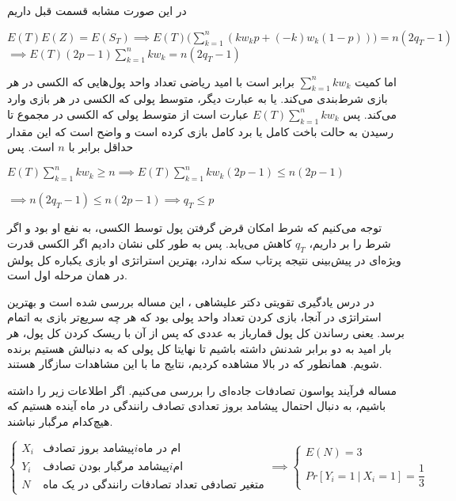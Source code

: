 \documentclass{scribe-cgenomics}
\begin{document}
\begin{حل}
در این صورت مشابه قسمت قبل داریم

\begin{center}
$
E(T)E(Z) = E(S_T) 
\implies
E(T) \big( \sum_{k=1}^{n} (kw_k p + (-k)w_k(1-p)) \big) = n(2q_T-1)
$
\bigbreak
$
\implies
E(T)(2p-1)\sum_{k=1}^{n} kw_k = n(2q_T-1)
$
\end{center}

اما کمیت
$\sum_{k=1}^{n}kw_k$
برابر است با امید ریاضی تعداد واحد پول‌هایی که الکسی در هر بازی شرط‌بندی می‌کند. یا به عبارت دیگر، متوسط پولی که الکسی در هر بازی وارد می‌کند. پس
$E(T)\sum_{k=1}^{n}kw_k$
عبارت است از متوسط پولی که الکسی در مجموع تا رسیدن به
حالت باخت کامل یا برد کامل بازی کرده است و واضح است که این مقدار حداقل برابر با
$n$
است. پس

\begin{center}
$
E(T) \sum_{k=1}^{n}kw_k \geq n
\implies 
E(T) \sum_{k=1}^{n}kw_k (2p-1) \leq n (2p-1)
$

$
\implies 
n(2q_T-1) \leq n(2p-1)
\implies
q_T \leq p
$
\end{center}

توجه می‌کنیم که شرط امکان قرض گرفتن پول توسط الکسی، به نفع او بود و اگر شرط را بر داریم،
$q_T$
کاهش می‌یابد. پس به طور کلی نشان دادیم اگر الکسی قدرت ویژه‌ای در پیش‌بینی نتیجه پرتاب سکه ندارد، بهترین استراتژی او بازی یکباره کل پولش در همان مرحله اول است.

\bigbreak

در درس یادگیری تقویتی دکتر علیشاهی
\cite{alishahi_RL}، 
این مساله بررسی شده است و بهترین استراتژی در آنجا، بازی کردن تعداد واحد پولی بود که هر چه سریع‌تر بازی به اتمام برسد. یعنی رساندن کل پول قمارباز به عددی که پس از آن با ریسک کردن کل پول، هر بار امید به دو برابر شدنش داشته باشیم تا نهایتا کل پولی که به دنبالش هستیم برنده شویم. همانطور که در بالا مشاهده کردیم، نتایج ما با این مشاهدات سازگار هستند.

\end{حل}




\newpage
\begin{prob}
مساله فرآیند پواسون تصادفات جاده‌ای را بررسی می‌کنیم. اگر اطلاعات زیر را داشته باشیم، به دنبال احتمال پیشامد بروز تعدادی تصادف رانندگی در ماه آینده هستیم که هیچ‌کدام مرگبار نباشند.

\begin{center}
$
\begin{cases}
X_i &
\text{پیشامد بروز تصادف
$i$ام
در ماه
}
\\
Y_i &
\text{پیشامد مرگبار بودن تصادف
$i$ام}
\\
N &
\text{متغیر تصادفی تعداد تصادفات رانندگی در یک ماه}
\end{cases}
\implies
\begin{cases}
E(N) = 3\\
Pr[Y_i=1\ |\ X_i=1] = \dfrac{1}{3}
\end{cases}
$
\end{center}
\end{prob}
\end{document}
